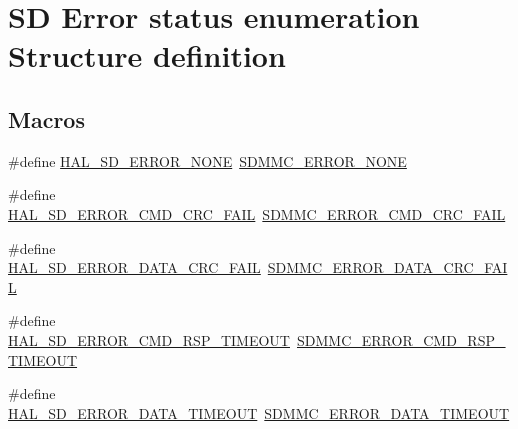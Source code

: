 \hypertarget{group___s_d___exported___constansts___group1}{}\section{SD Error status enumeration Structure definition}
\label{group___s_d___exported___constansts___group1}
\subsection*{Macros}
\begin{DoxyCompactItemize}
\item 
\#define \mbox{\hyperlink{group___s_d___exported___constansts___group1_ga028a1a8c6d9bb7c61841f4c4cbbe08ba}{H\+A\+L\+\_\+\+S\+D\+\_\+\+E\+R\+R\+O\+R\+\_\+\+N\+O\+NE}}~\mbox{\hyperlink{group___s_d_m_m_c___l_l___exported___constants_ga93073e91908c0e8527a4bcb2c3dd95f1}{S\+D\+M\+M\+C\+\_\+\+E\+R\+R\+O\+R\+\_\+\+N\+O\+NE}}
\item 
\#define \mbox{\hyperlink{group___s_d___exported___constansts___group1_gab0cc8b98624e3e438a293dcd3377453e}{H\+A\+L\+\_\+\+S\+D\+\_\+\+E\+R\+R\+O\+R\+\_\+\+C\+M\+D\+\_\+\+C\+R\+C\+\_\+\+F\+A\+IL}}~\mbox{\hyperlink{group___s_d_m_m_c___l_l___exported___constants_ga29339b7153b88dc4eaf4faa7b46ccc4d}{S\+D\+M\+M\+C\+\_\+\+E\+R\+R\+O\+R\+\_\+\+C\+M\+D\+\_\+\+C\+R\+C\+\_\+\+F\+A\+IL}}
\item 
\#define \mbox{\hyperlink{group___s_d___exported___constansts___group1_ga0689297eca4477d2ccd181ad065dccaf}{H\+A\+L\+\_\+\+S\+D\+\_\+\+E\+R\+R\+O\+R\+\_\+\+D\+A\+T\+A\+\_\+\+C\+R\+C\+\_\+\+F\+A\+IL}}~\mbox{\hyperlink{group___s_d_m_m_c___l_l___exported___constants_ga6a742a4691747d28e434d78db107e270}{S\+D\+M\+M\+C\+\_\+\+E\+R\+R\+O\+R\+\_\+\+D\+A\+T\+A\+\_\+\+C\+R\+C\+\_\+\+F\+A\+IL}}
\item 
\#define \mbox{\hyperlink{group___s_d___exported___constansts___group1_gae4adbdefde74d1858399e45cad414099}{H\+A\+L\+\_\+\+S\+D\+\_\+\+E\+R\+R\+O\+R\+\_\+\+C\+M\+D\+\_\+\+R\+S\+P\+\_\+\+T\+I\+M\+E\+O\+UT}}~\mbox{\hyperlink{group___s_d_m_m_c___l_l___exported___constants_ga9499308f3d28ad8043a9b53c779e23b4}{S\+D\+M\+M\+C\+\_\+\+E\+R\+R\+O\+R\+\_\+\+C\+M\+D\+\_\+\+R\+S\+P\+\_\+\+T\+I\+M\+E\+O\+UT}}
\item 
\#define \mbox{\hyperlink{group___s_d___exported___constansts___group1_ga9ad9eaaaaae7377c4c9b14055e656d31}{H\+A\+L\+\_\+\+S\+D\+\_\+\+E\+R\+R\+O\+R\+\_\+\+D\+A\+T\+A\+\_\+\+T\+I\+M\+E\+O\+UT}}~\mbox{\hyperlink{group___s_d_m_m_c___l_l___exported___constants_gab626df2cece3785818557223caad77d8}{S\+D\+M\+M\+C\+\_\+\+E\+R\+R\+O\+R\+\_\+\+D\+A\+T\+A\+\_\+\+T\+I\+M\+E\+O\+UT}}

\end{DoxyCompactItemize}
